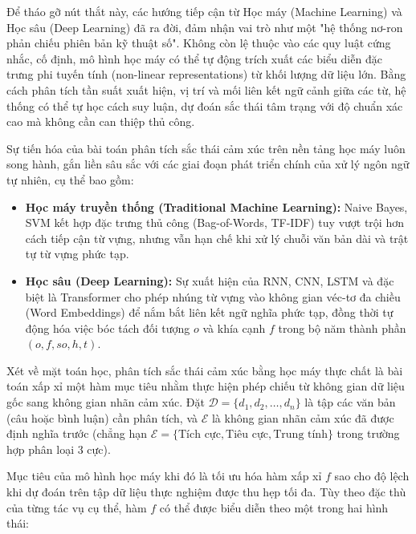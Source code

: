 Để tháo gỡ nút thắt này, các hướng tiếp cận từ Học máy (Machine Learning) và Học sâu (Deep Learning) đã ra đời, đảm nhận vai trò như một "hệ thống nơ-ron phản chiếu phiên bản kỹ thuật số". Không còn lệ thuộc vào các quy luật cứng nhắc, cố định, mô hình học máy có thể tự động trích xuất các biểu diễn đặc trưng phi tuyến tính (non-linear representations) từ khối lượng dữ liệu lớn. Bằng cách phân tích tần suất xuất hiện, vị trí và mối liên kết ngữ cảnh giữa các từ, hệ thống có thể tự học cách suy luận, dự đoán sắc thái tâm trạng với độ chuẩn xác cao mà không cần can thiệp thủ công.

Sự tiến hóa của bài toán phân tích sắc thái cảm xúc trên nền tảng học máy luôn song hành, gắn liền sâu sắc với các giai đoạn phát triển chính của xử lý ngôn ngữ tự nhiên, cụ thể bao gồm:
\begin{itemize}
    \item \textbf{Học máy truyền thống (Traditional Machine Learning):} Naive Bayes, SVM kết hợp đặc trưng thủ công (Bag-of-Words, TF-IDF) tuy vượt trội hơn cách tiếp cận từ vựng, nhưng vẫn hạn chế khi xử lý chuỗi văn bản dài và trật tự từ vựng phức tạp.
    \item \textbf{Học sâu (Deep Learning):} Sự xuất hiện của RNN, CNN, LSTM và đặc biệt là Transformer cho phép nhúng từ vựng vào không gian véc-tơ đa chiều (Word Embeddings) để nắm bắt liên kết ngữ nghĩa phức tạp, đồng thời tự động hóa việc bóc tách đối tượng $o$ và khía cạnh $f$ trong bộ năm thành phần $(o, f, so, h, t)$.
\end{itemize}

Xét về mặt toán học, phân tích sắc thái cảm xúc bằng học máy thực chất là bài toán xấp xỉ một hàm mục tiêu nhằm thực hiện phép chiếu từ không gian dữ liệu gốc sang không gian nhãn cảm xúc. Đặt $\mathcal{D} = \{d_1, d_2, \dots, d_n\}$ là tập các văn bản (câu hoặc bình luận) cần phân tích, và $\mathcal{E}$ là không gian nhãn cảm xúc đã được định nghĩa trước (chẳng hạn $\mathcal{E} = \{\text{Tích cực}, \text{Tiêu cực}, \text{Trung tính}\}$ trong trường hợp phân loại 3 cực).

Mục tiêu của mô hình học máy khi đó là tối ưu hóa hàm xấp xỉ $f$ sao cho độ lệch khi dự đoán trên tập dữ liệu thực nghiệm được thu hẹp tối đa. Tùy theo đặc thù của từng tác vụ cụ thể, hàm $f$ có thể được biểu diễn theo một trong hai hình thái:


